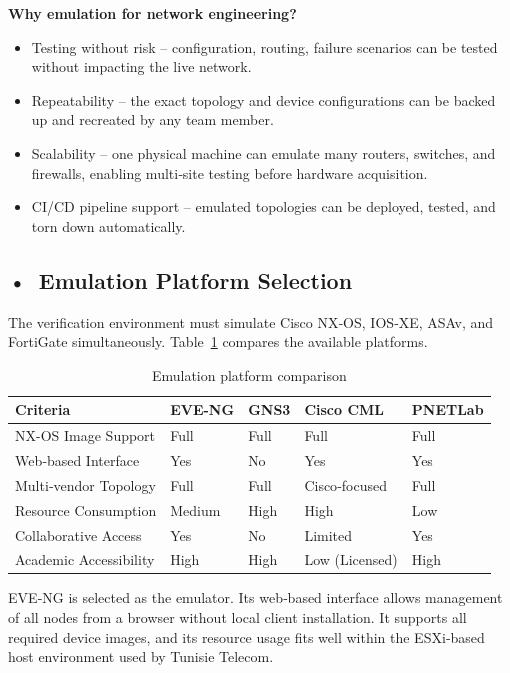 \textbf{Why emulation for network engineering?}
\begin{itemize}
    \item Testing without risk – configuration, routing, failure scenarios can be tested without impacting the live network.
    \item Repeatability – the exact topology and device configurations can be backed up and recreated by any team member.
    \item Scalability – one physical machine can emulate many routers, switches, and firewalls, enabling multi‑site testing before hardware acquisition.
    \item CI/CD pipeline support – emulated topologies can be deployed, tested, and torn down automatically.
\end{itemize}

\subsection*{\mbox{•}~Emulation Platform Selection}
The verification environment must simulate Cisco NX‑OS, IOS‑XE, ASAv, and FortiGate simultaneously. Table~\ref{tab:emulation-comparison} compares the available platforms.

\begin{table}[!htbp]
\centering
\small
\renewcommand{\arraystretch}{1}
\setlength{\tabcolsep}{0.45em}
\begin{tabularx}{\textwidth}{@{}X l l l l@{}}
\toprule
\textbf{Criteria} & \textbf{EVE-NG} & \textbf{GNS3} & \textbf{Cisco CML} & \textbf{PNETLab} \\ \midrule
NX-OS Image Support & Full & Full & Full & Full \\
Web‑based Interface & Yes & No & Yes & Yes \\
Multi‑vendor Topology & Full & Full & Cisco‑focused & Full \\
Resource Consumption & Medium & High & High & Low \\
Collaborative Access & Yes & No & Limited & Yes \\
Academic Accessibility & High & High & Low (Licensed) & High \\ \bottomrule
\end{tabularx}
\caption{Emulation platform comparison}
\label{tab:emulation-comparison}
\end{table}

EVE‑NG is selected as the emulator. Its web‑based interface allows management of all nodes from a browser without local client installation. It supports all required device images, and its resource usage fits well within the ESXi‑based host environment used by Tunisie Telecom.

